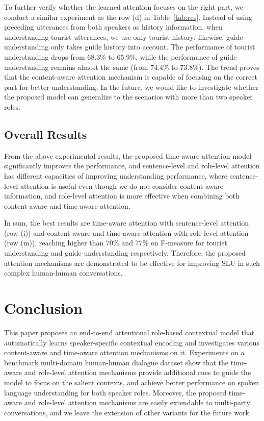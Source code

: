 \documentclass{article}
\begin{document}
To further verify whether the learned attention focuses on the right part, we conduct a similar experiment as the row (d) in Table~\ref{tab:res}.
Instead of using preceding utterances from both speakers as history information,
when understanding tourist utterances, we use only tourist history; likewise, guide understanding only takes guide history into account.
The performance of tourist understanding drops from 68.3\% to 65.9\%, while the performance of guide understanding remains almost the same (from 74.4\% to 73.8\%).
The trend proves that the content-aware attention mechanism is capable of focusing on the correct part for better understanding.
In the future, we would like to investigate whether the proposed model can generalize to the scenarios with more than two speaker roles.

\subsection{Overall Results}
From the above experimental results, the proposed time-aware attention model significantly improves the performance, and sentence-level and role-level attention has different capacities of improving understanding performance, where sentence-level attention is useful even though we do not consider content-aware information, and role-level attention is more effective when combining both content-aware and time-aware attention.

In sum, the best results are time-aware attention with sentence-level attention (row (i)) and content-aware and time-aware attention with role-level attention (row (m)), reaching higher than 70\% and 77\% on F-measure for tourist understanding and guide understanding respectively.
Therefore, the proposed attention mechanisms are demonstrated to be effective for improving SLU in such complex human-human conversations.

\section{Conclusion}
This paper proposes an end-to-end attentional role-based contextual model that automatically learns speaker-specific contextual encoding and investigates various content-aware and time-aware attention mechanisms on it.
Experiments on a benchmark multi-domain human-human dialogue dataset show that the time-aware and role-level attention mechanisms provide additional cues to guide the model to focus on the salient contexts, and achieve better performance on spoken language understanding for both speaker roles. 
Moreover, the proposed time-aware and role-level attention mechanisms are easily extendable to multi-party conversations, and we leave the extension of other variants for the future work.
\end{document}
